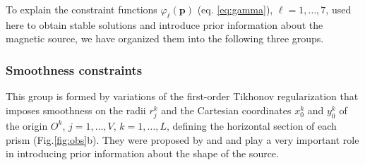 To explain the constraint functions $\varphi_{\ell}(\mathbf{p})$ (eq. \ref{eq:gamma}), $\ell = 1, \dots, 7$, used here to obtain stable solutions and introduce prior information about the magnetic source, we have organized them into the following three groups.

\subsubsection{Smoothness constraints}

This group is formed by variations of the first-order Tikhonov regularization \cite[][ p. 103]{aster-etal2019} that imposes smoothness on the radii $r_{j}^{k}$ and the Cartesian coordinates $x_{0}^{k}$ and $y_{0}^{k}$ of the origin $O^{k}$, $j = 1, \dots, V$, $k = 1, \dots, L$, defining the horizontal section of each prism (Fig.\ref{fig:obs}b).
They were proposed by \cite{oliveirajr-etal2011} and \cite{oliveirajr-barbosa2013} and play a very important role in introducing prior information about the shape of the source. 

